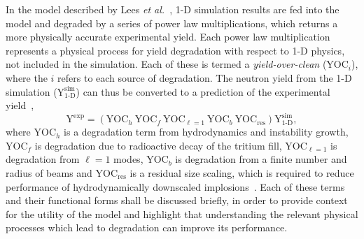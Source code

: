 In the model described by Lees \textit{et al.}~\cite{lees_experimentally_2021}, 1-D simulation results are fed into the model and degraded by a series of power law multiplications, which returns a more physically accurate experimental yield.
Each power law multiplication represents a physical process for yield degradation with respect to 1-D physics, not included in the simulation.
Each of these is termed a \textit{yield-over-clean} ($\text{YOC}_i$), where the $i$ refers to each source of degradation.
The neutron yield from the 1-D simulation ($\text{Y}^{\text{sim}}_{1\text{-D}}$) can thus be converted to a prediction of the experimental yield~\cite{lees_experimentally_2021},
\begin{equation}
    \text{Y}^{\text{exp}} = \left( \text{YOC}_h\ \text{YOC}_f\ \text{YOC}_{\ell=1}\ \text{YOC}_b\ \text{YOC}_{\text{res}} \right) \text{Y}^{\text{sim}}_{1\text{-D}},
\end{equation}
where $\text{YOC}_h$ is a degradation term from hydrodynamics and instability growth, $\text{YOC}_f$ is degradation due to radioactive decay of the tritium fill, $\text{YOC}_{\ell=1}$ is degradation from $\ell=1$ modes, $\text{YOC}_b$ is degradation from a finite number and radius of beams and $\text{YOC}_{\text{res}}$ is a residual size scaling, which is required to reduce performance of hydrodynamically downscaled implosions~\cite{thomas_quantifying_2020}.
Each of these terms and their functional forms shall be discussed briefly, in order to provide context for the utility of the model and highlight that understanding the relevant physical processes which lead to degradation can improve its performance.

